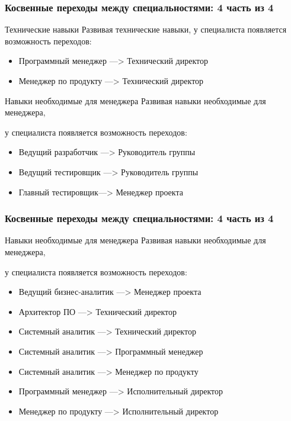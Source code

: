 \documentclass{../industrial-development}
\begin{document}
\begin{frame} \frametitle{Косвенные переходы между специальностями: 4 часть из 4}
 \begin{block}{Технические навыки}
 Развивая \alert{технические навыки}, у специалиста появляется возможность переходов: 
\begin{itemize}
  \item Программный менеджер ---> Технический директор
  \item Менеджер по продукту ---> Технический директор
  \end{itemize}
  \end{block}
\begin{block}{Навыки необходимые для менеджера}
 Развивая \alert{навыки необходимые для менеджера}, 

у специалиста появляется возможность переходов: 
\begin{itemize}
  \item Ведущий разработчик ---> Руководитель группы
  \item Ведущий тестировщик ---> Руководитель группы
\item Главный тестировщик---> Менеджер проекта
  \end{itemize}
  \end{block}
\end{frame}

\begin{frame} \frametitle{Косвенные переходы между специальностями: 4 часть из 4}
 \begin{block}{Навыки необходимые для менеджера}
Развивая \alert{навыки необходимые для менеджера}, 

у специалиста появляется возможность переходов: 
\begin{itemize}
 \item Ведущий бизнес-аналитик ---> Менеджер проекта
  \item Архитектор ПО  ---> Технический директор
\item  Системный аналитик ---> Технический директор
 \item Системный аналитик ---> Программный менеджер
 \item Системный аналитик ---> Менеджер по продукту
\item  Программный менеджер ---> Исполнительный директор
\item Менеджер по продукту  ---> Исполнительный директор
  \end{itemize}
  \end{block}

\end{frame}
\end{document}

